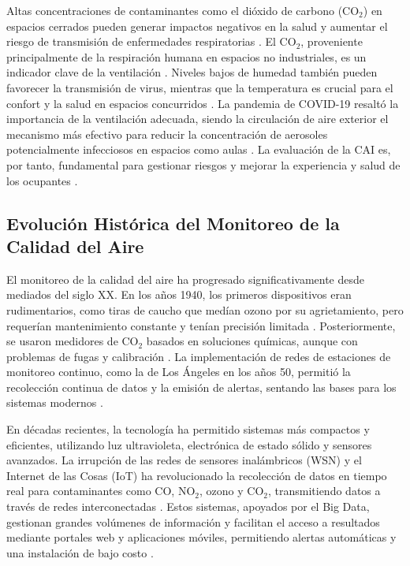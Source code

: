 Altas concentraciones de contaminantes como el dióxido de carbono (CO\(_2\)) en espacios cerrados pueden generar impactos negativos en la salud y aumentar el riesgo de transmisión de enfermedades respiratorias \cite{contreras_perez_2020, effects_of_low_level_inhalation_exposure_to_carbon_dioxide_in_indoor_environments_a_short_review_on_human_health_and_psychomotor_performance}. El CO\(_2\), proveniente principalmente de la respiración humana en espacios no industriales, es un indicador clave de la ventilación \cite{contreras_perez_2020}. Niveles bajos de humedad también pueden favorecer la transmisión de virus, mientras que la temperatura es crucial para el confort y la salud en espacios concurridos \cite{contreras_perez_2020}. La pandemia de COVID-19 resaltó la importancia de la ventilación adecuada, siendo la circulación de aire exterior el mecanismo más efectivo para reducir la concentración de aerosoles potencialmente infecciosos en espacios como aulas \cite{contreras_perez_2020}. La evaluación de la CAI es, por tanto, fundamental para gestionar riesgos y mejorar la experiencia y salud de los ocupantes \cite{contreras_perez_2020, envira_nodate, higiene_ambiental_nodate}.

\subsection{Evolución Histórica del Monitoreo de la Calidad del Aire}
El monitoreo de la calidad del aire ha progresado significativamente desde mediados del siglo XX. En los años 1940, los primeros dispositivos eran rudimentarios, como tiras de caucho que medían ozono por su agrietamiento, pero requerían mantenimiento constante y tenían precisión limitada \cite{The_Evolution_of_Air_Quality_Monitoring}. Posteriormente, se usaron medidores de CO\(_2\) basados en soluciones químicas, aunque con problemas de fugas y calibración \cite{The_Evolution_of_Air_Quality_Monitoring}. La implementación de redes de estaciones de monitoreo continuo, como la de Los Ángeles en los años 50, permitió la recolección continua de datos y la emisión de alertas, sentando las bases para los sistemas modernos \cite{The_Evolution_of_Air_Quality_Monitoring, indoor_air_quality_guidelines_from_across_the_world_an_appraisal_considering_energy_saving_health_productivity_and_comfort}.

En décadas recientes, la tecnología ha permitido sistemas más compactos y eficientes, utilizando luz ultravioleta, electrónica de estado sólido y sensores avanzados. La irrupción de las redes de sensores inalámbricos (WSN) y el Internet de las Cosas (IoT) ha revolucionado la recolección de datos en tiempo real para contaminantes como CO, NO\(_2\), ozono y CO\(_2\), transmitiendo datos a través de redes interconectadas \cite{Indoor_Air_Quality_Monitoring_Systems_A_Comprehensive_Review_of_Different_IAQM_Systems, The_Evolution_of_Air_Quality_Monitoring}. Estos sistemas, apoyados por el Big Data, gestionan grandes volúmenes de información y facilitan el acceso a resultados mediante portales web y aplicaciones móviles, permitiendo alertas automáticas y una instalación de bajo costo \cite{Indoor_Air_Quality_Monitoring_Systems_A_Comprehensive_Review_of_Different_IAQM_Systems}.

